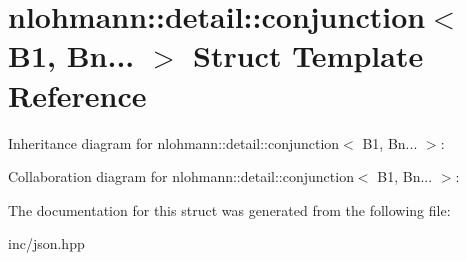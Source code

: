 \hypertarget{structnlohmann_1_1detail_1_1conjunction_3_01B1_00_01Bn_8_8_8_01_4}{}\section{nlohmann\+:\+:detail\+:\+:conjunction$<$ B1, Bn... $>$ Struct Template Reference}
\label{structnlohmann_1_1detail_1_1conjunction_3_01B1_00_01Bn_8_8_8_01_4}


Inheritance diagram for nlohmann\+:\+:detail\+:\+:conjunction$<$ B1, Bn... $>$\+:


Collaboration diagram for nlohmann\+:\+:detail\+:\+:conjunction$<$ B1, Bn... $>$\+:


The documentation for this struct was generated from the following file\+:\begin{DoxyCompactItemize}
\item 
inc/json.\+hpp\end{DoxyCompactItemize}
